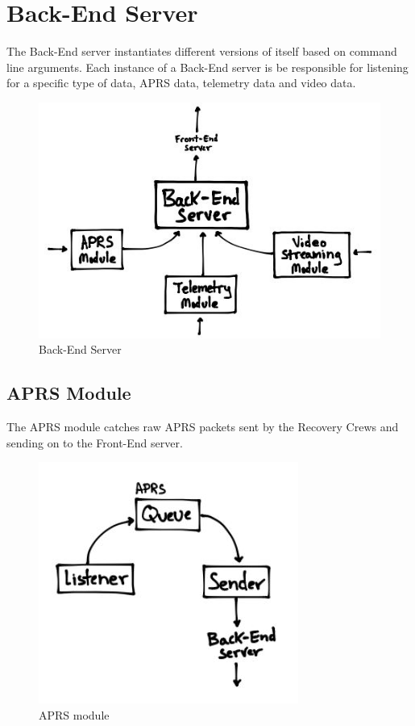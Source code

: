 \section{Back-End Server}
The Back-End server instantiates different versions of itself based on command line arguments.
Each instance of a Back-End server is be responsible for listening for a specific type of data,
APRS data, telemetry data and video data.

\begin{figure}[!ht]
  \centering
  \includegraphics[scale=.8]{imgs/back-end-server.jpg}
  \caption{Back-End Server}
\end{figure}

\subsection{APRS Module}
The APRS module catches raw APRS packets sent by the Recovery Crews and sending on to the Front-End server.

\begin{figure}[!ht]
  \centering
  \includegraphics[scale=.8]{imgs/aprs-detailed.jpg}
  \caption{APRS module}
\end{figure}

